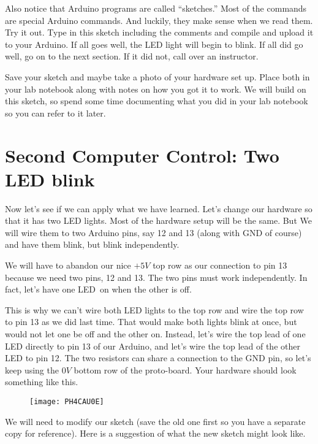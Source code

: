 Also notice that Arduino programs are called ``sketches.'' Most of the commands are special Arduino commands. And luckily, they make sense when we read them. Try it out. Type in this sketch including the comments and compile and upload it to your Arduino. If all goes well, the LED light will begin to blink. If all did go well, go on to the next section. If it did not, call over an instructor. 

Save your sketch and maybe take a photo of your hardware set up. Place both in your lab notebook along with notes on how you got it to work. We will build on this sketch, so spend some time documenting what you did in your lab notebook so you can refer to it later.

\section{Second Computer Control: Two LED blink}

Now let's see if we can apply what we have learned. Let's change our hardware so that it has two LED lights. Most of the hardware setup will be the same. But We will wire them to two Arduino pins, say 12 and 13 (along with GND of course) and have them blink, but blink independently.

We will have to abandon our nice $+5\unit{V}$ top row as our connection to pin 13 because we need two pins, 12 and 13. The two pins must work independently. In fact, let's have one LED\ on when the other is off.

This is why we can't wire both LED lights to the top row and wire the top row to pin 13 as we did last time. That would make both lights blink at once, but would not let one be off and the other on. Instead, let's wire the top lead of one LED directly to pin 13 of our Arduino, and let's wire the top lead of the other LED to pin 12. The two resistors can share a connection to the GND pin, so let's keep using the $0\unit{V}$ bottom row of the proto-board. Your hardware should look something like this.

\begin{figure}[h!]
	\centering
	\texttt{[image: PH4CAU0E]}
\end{figure}

We will need to modify our sketch (save the old one first so you have a separate copy for reference). Here is a suggestion of what the new sketch might look like.




